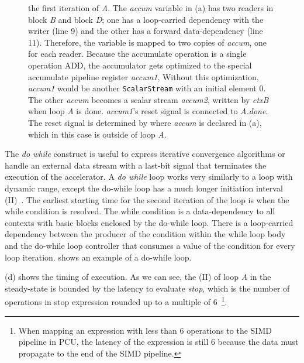 \begin{figure}
{the first iteration of \emph{A}.
The \emph{accum} variable in (a) has two readers in block \emph{B} and block \emph{D}; one has a
loop-carried dependency with the writer (line 9) and the other has a forward data-dependency (line
11). 
Therefore, the variable is mapped to two copies of \emph{accum}, one for each reader. 
Because the accumulate operation is a single operation ADD, the accumulator gets optimized to the special
accumulate pipeline register \emph{accum1}, 
Without this optimization, \emph{accum1} would be another \texttt{ScalarStream} with an initial
element 0.
The other \emph{accum} becomes a scalar stream \emph{accum2}, written by \emph{ctxB} when loop \emph{A}
is done.
  \emph{accum1}'s reset signal is connected to \emph{A.done}. The reset signal is determined by where
  \emph{accum} is declared in (a), which in this case is outside of loop \emph{A}.
}
\label{fig:dowhile} 
\end{figure}

The \emph{do while} construct is useful to express iterative convergence algorithms or handle an external
data stream with a last-bit signal that terminates the execution of the accelerator.
A \emph{do while} loop works very similarly to a loop with dynamic range, except the do-while loop has a much
longer initiation interval (II)~\cite{II}. 
The earliest starting time for the second iteration of the loop is when the while condition is resolved.
The while condition is a data-dependency to all contexts with basic blocks enclosed by the do-while loop.
There is a loop-carried dependency between the producer of the condition within the while loop body
and the do-while loop controller that consumes a value of the condition for every loop iteration.
 shows an example of a do-while loop.

(d) shows the timing of execution. As we can see, the (II) of loop \emph{A}
in the steady-state is bounded by the latency to evaluate \emph{stop}, which is the number of
operations in stop expression rounded up to a multiple of 6~\footnote{When mapping an expression
with less than 6 operations to the SIMD pipeline in PCU, the latency of the expression is still 6 
because the data must propagate to the end of the SIMD pipeline.}.

